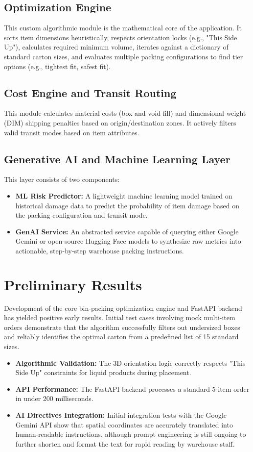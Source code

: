 \documentclass[12pt,a4paper]{article}
\begin{document}
\subsection{Optimization Engine}
This custom algorithmic module is the mathematical core of the application. It sorts item dimensions heuristically, respects orientation locks (e.g., "This Side Up"), calculates required minimum volume, iterates against a dictionary of standard carton sizes, and evaluates multiple packing configurations to find tier options (e.g., tightest fit, safest fit).

\subsection{Cost Engine and Transit Routing}
This module calculates material costs (box and void-fill) and dimensional weight (DIM) shipping penalties based on origin/destination zones. It actively filters valid transit modes based on item attributes.

\subsection{Generative AI and Machine Learning Layer}
This layer consists of two components:
\begin{itemize}
    \item \textbf{ML Risk Predictor:} A lightweight machine learning model trained on historical damage data to predict the probability of item damage based on the packing configuration and transit mode.
    \item \textbf{GenAI Service:} An abstracted service capable of querying either Google Gemini or open-source Hugging Face models to synthesize raw metrics into actionable, step-by-step warehouse packing instructions.
\end{itemize}

\section{Preliminary Results}
Development of the core bin-packing optimization engine and FastAPI backend has yielded positive early results. Initial test cases involving mock multi-item orders demonstrate that the algorithm successfully filters out undersized boxes and reliably identifies the optimal carton from a predefined list of 15 standard sizes. 
\begin{itemize}
    \item \textbf{Algorithmic Validation:} The 3D orientation logic correctly respects "This Side Up" constraints for liquid products during placement.
    \item \textbf{API Performance:} The FastAPI backend processes a standard 5-item order in under 200 milliseconds.
    \item \textbf{AI Directives Integration:} Initial integration tests with the Google Gemini API show that spatial coordinates are accurately translated into human-readable instructions, although prompt engineering is still ongoing to further shorten and format the text for rapid reading by warehouse staff.
\end{itemize}
\end{document}

